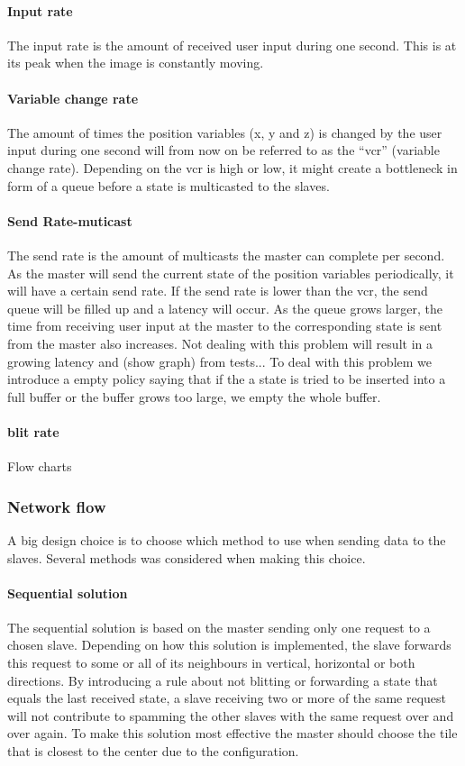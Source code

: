 \documentclass[12pt, a4paper, oneside]{article}
\begin{document}
\paragraph{Input rate}
The input rate is the amount of received user input during one second. This is at its peak when the image is constantly moving.
\paragraph{Variable change rate}
The amount of times the position variables (x, y and z) is changed by the user input during one second will from now on be referred to as the “vcr” (variable change rate).
Depending on the vcr is high or low, it might create a bottleneck in form of a queue before a state is multicasted to the slaves. 
\paragraph{Send Rate-muticast}
The send rate is the amount of multicasts the master can complete per second. As the master will send the current state of the position variables periodically, it will have a certain send rate. If the send rate is lower than the vcr, the send queue will be filled up and a latency will occur. As the queue grows larger, the time from receiving user input at the master to the corresponding state is sent from the master also increases. 
Not dealing with this problem will result in a growing latency and (show graph) from tests... 
To deal with this problem we introduce a empty policy saying that if the a state is tried to be inserted into a full buffer or the buffer grows too large, we empty the whole buffer.
\paragraph{blit rate}
Flow charts

\subsubsection{Network flow}
A big design choice is to choose which method to use when sending data to the slaves. Several methods was considered when making this choice. 

\paragraph{Sequential solution}
The sequential solution is based on the master sending only one request to a chosen slave. Depending on how this solution is implemented, the slave forwards this request to some or all of its neighbours in vertical, horizontal or both directions. By introducing a rule about not blitting or forwarding a state that equals the last received state, a slave receiving two or more of the same request will not contribute to spamming the other slaves with the same request over and over again. To make this solution most effective the master should choose the tile that is closest to the center due to the configuration.
\end{document}
